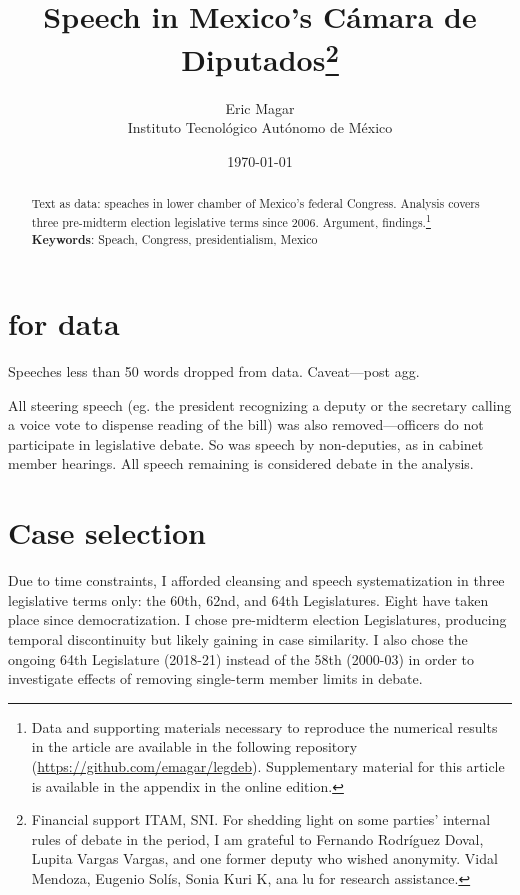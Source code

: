 \documentclass[letter,12pt]{article}
\begin{document}
\title{Speech in Mexico's Cámara de Diputados\thanks{Financial support ITAM, SNI. For shedding light on some parties' internal rules of debate in the period, I am grateful to Fernando Rodríguez Doval, Lupita Vargas Vargas, and one former deputy who wished anonymity. Vidal Mendoza, Eugenio Solís, Sonia Kuri K, ana lu for research assistance.}}
\author{Eric Magar \\ Instituto Tecnológico Autónomo de México}
\date{\today}
\maketitle

\newpage

\begin{abstract}
\noindent Text as data: speaches in lower chamber of Mexico's federal Congress. Analysis covers three pre-midterm election legislative terms since 2006. Argument, findings.\footnote{{Data and supporting materials necessary to reproduce the numerical results in the article are available in the following repository (\url{https://github.com/emagar/legdeb}). Supplementary material for this article is available in the appendix in the online edition.}}
\newline
\newline
\textbf{Keywords}: Speach, Congress, presidentialism, Mexico 
\end{abstract}

\newpage

\doublespacing

\section{for data}

Speeches less than 50 words dropped from data. Caveat---post agg.

All steering speech (eg. the president recognizing a deputy or the secretary calling a voice vote to dispense reading of the bill) was also removed---officers do not participate in legislative debate. So was speech by non-deputies, as in cabinet member hearings. All speech remaining is considered debate in the analysis.  

\section{Case selection}

Due to time constraints, I afforded cleansing and speech systematization in three legislative terms only: the 60th, 62nd, and 64th Legislatures. Eight have taken place since democratization. I chose pre-midterm election Legislatures, producing temporal discontinuity but likely gaining in case similarity. I also chose the ongoing 64th Legislature (2018-21) instead of the 58th (2000-03) in order to investigate effects of removing single-term member limits in debate. 
\end{document}
